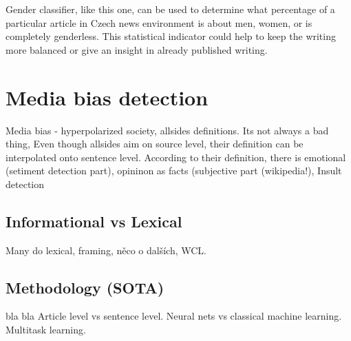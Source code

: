 Gender classifier, like this one, can be used to determine what percentage of a particular article in Czech news environment is about men, women, or is completely genderless. This statistical indicator could help to keep the writing more balanced or give an insight in already published writing.




\section{Media bias detection}
Media bias - hyperpolarized society, allsides definitions. Its not always a bad thing, Even though allsides aim on source level, their definition can be interpolated onto sentence level. According to their definition, there is emotional (setiment detection part), opininon as facts (subjective part (wikipedia!), Insult detection
\subsection{Informational vs Lexical}
Many do lexical, framing, něco o dalších, WCL.
\subsection{Methodology (SOTA)}\label{methodology}
bla bla Article level vs sentence level. Neural nets vs classical machine learning. Multitask learning.